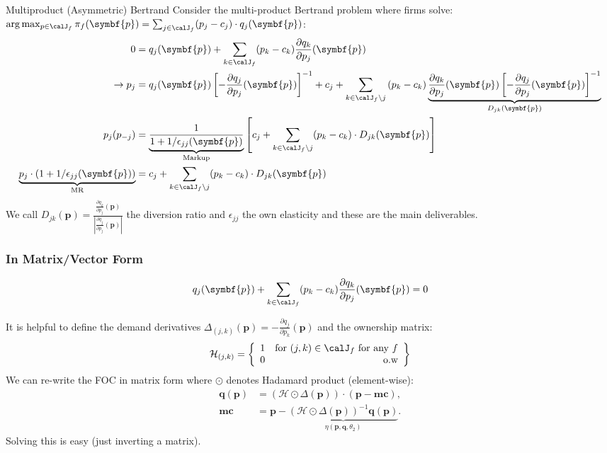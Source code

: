 \begin{frame}{Multiproduct (Asymmetric) Bertrand}
\small
Consider the multi-product Bertrand problem where firms solve: $\arg \max_{p \in \calJ_f} \pi_f (\symbf{p}) = \sum_{j \in \calJ_f} (p_j - c_j) \cdot q_j(\symbf{p})$:
\begin{align*}
 0&= q_j(\symbf{p}) + \sum_{k \in \calJ_f} (p_k - c_k) \frac{\partial q_{k}}{\partial p_j}(\symbf{p}) \\
\rightarrow p_j &=q_{j}(\symbf{p}) \left[-\frac{\partial q_{j}}{\partial p_{j}}(\symbf{p})\right]^{-1} + c_{j} + \sum_{k \in \calJ_{f} \setminus j} \left(p_{k}-c_{k}\right) \underbrace{\frac{\partial q_{k}}{\partial p_{j}}(\symbf{p})\left[-\frac{\partial q_{j}}{\partial p_{j}}(\symbf{p})\right]^{-1}}_{D_{jk}(\symbf{p})}\\
p_j(p_{-j}) &= \underbrace{\frac{1}{1+1/\epsilon_{jj}(\symbf{p})}}_{\text{Markup}} \left[ c_j + \sum_{k \in \calJ_{f} \setminus j}  (p_k-c_k) \cdot  D_{jk} (\symbf{p}) \right]\\
\underbrace{p_j\cdot\left(1+1/\epsilon_{jj}(\symbf{p})\right)}_{\text{MR}} &=  c_j + \sum_{k \in \calJ_{f} \setminus j}  (p_k-c_k) \cdot  D_{jk} (\symbf{p})
\end{align*}
We call $D_{jk}(\symbf{p}) = \frac{\frac{\partial q_{k}}{\partial p_j}(\symbf{p})}{\left| \frac{\partial q_{j}}{\partial p_j}(\symbf{p}) \right|}$ the \alert{diversion ratio} and $\epsilon_{jj}$ the \alert{own elasticity} and these are the main deliverables.
\end{frame}




\begin{frame}[plain]
\frametitle{In Matrix/Vector Form}
\begin{align*}
q_j(\symbf{p}) + \sum_{k \in \calJ_f} (p_k - c_k) \frac{\partial q_{k}}{\partial p_j}(\symbf{p}) =0
\end{align*}

It is helpful to define the \alert{demand derivatives} $\Delta_{(j,k)}(\symbf{p})  = - \frac{\partial q_{j}}{\partial p_k}(\symbf{p})$ and the \alert{ownership matrix}:
\begin{align*}
\mathcal{H}_{(j,k)} = \left\{\begin{array}{lr}
          1 & \text{for }  (j,k) \in \calJ_f \text{ for any } f \\ 
      0 & \text{o.w}\\
        \end{array} \right\}
\end{align*}
We can re-write the FOC in matrix form where $\odot$ denotes Hadamard product (element-wise):
\begin{align*}
        \symbf{q}(\symbf{p}) &= (\mathcal{H} \odot \Delta(\symbf{p})) \cdot (\symbf{p} - \symbf{mc}), \\
       \symbf{mc} &=  \symbf{p} - \underbrace{(\mathcal{H} \odot \Delta(\symbf{p}))^{-1} \symbf{q}(\symbf{p})}_{\eta(\symbf{p},\symbf{q},\theta_2)}.
\end{align*}
Solving this is easy (just inverting a matrix).
\end{frame}


